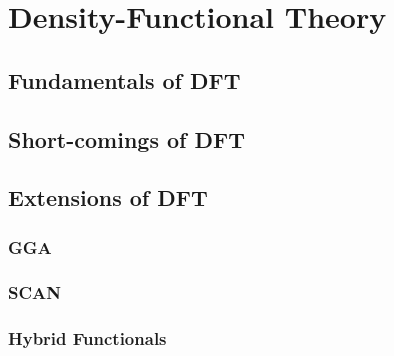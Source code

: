 \chapter{Density-Functional Theory}
\label{sec:DFT}


\section{Fundamentals of DFT}

\section{Short-comings of DFT}


\section{Extensions of DFT}

\subsection{GGA}
\subsection{SCAN}
\subsection{Hybrid Functionals}


